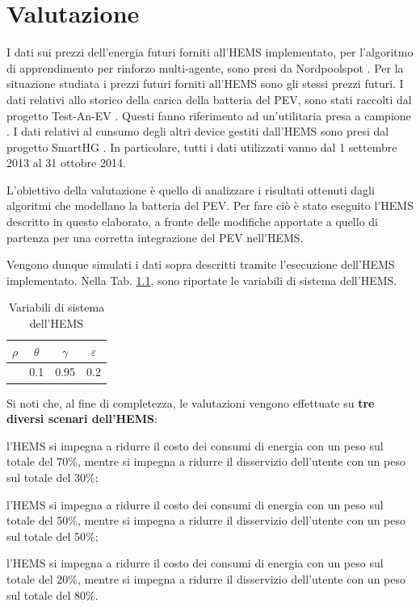 \documentclass[italian, Lau, oneside]{sapthesis}
\begin{document}
\chapter{Valutazione}
\label{cap:6}
I dati sui prezzi dell'energia futuri forniti all'HEMS implementato, per l'algoritmo di apprendimento per rinforzo multi-agente, sono presi da Nordpoolspot \cite{ref:nordpool}. Per la situazione studiata i prezzi futuri forniti all'HEMS sono gli stessi prezzi futuri. I dati relativi allo storico della carica della batteria del PEV, sono stati raccolti dal progetto Test-An-EV \cite{ref:PEVdata}. Questi fanno riferimento ad un'utilitaria presa a campione \cite{ref:pev}. I dati relativi al cunsumo degli altri device gestiti dall'HEMS sono presi dal progetto SmartHG \cite{ref:SmartHG}. In particolare, tutti i dati utilizzati vanno dal 1 settembre 2013 al 31 ottobre 2014.

L'obiettivo della valutazione è quello di analizzare i risultati ottenuti dagli algoritmi che modellano la batteria del PEV. Per fare ciò è stato eseguito l'HEMS descritto in questo elaborato, a fronte delle modifiche apportate a quello di partenza per una corretta integrazione del PEV nell'HEMS.

Vengono dunque simulati i dati sopra descritti tramite l'esecuzione dell'HEMS implementato. Nella Tab. \ref{tab:variabili}, sono riportate le variabili di sistema dell'HEMS.


\begin{table}[h]
    \center
    \caption{Variabili di sistema dell'HEMS}
    \label{tab:variabili}
    \begin{tabular}{c|c|c|c}
        \hline
        \hline
        $\rho$ & $\theta$ & $\gamma$ & $\varepsilon$ \\
        \hline
        [0.3, 0.5, 0.8] & 0.1 & 0.95 & 0.2 \\
        \hline
        \hline
    \end{tabular}
\end{table}

Si noti che, al fine di completezza, le valutazioni vengono effettuate su \textbf{tre diversi scenari dell'HEMS}:
\begin{description}
\addtolength{\itemindent}{0.5cm}
    \item [scenario con $\mathbf{\rho = 0.3}$] l'HEMS si impegna a ridurre il costo dei consumi di energia con un peso sul totale del 70\%, mentre si impegna a ridurre il disservizio dell'utente con un peso sul totale del 30\%;
    \item [scenario con $\mathbf{\rho = 0.5}$] l'HEMS si impegna a ridurre il costo dei consumi di energia con un peso sul totale del 50\%, mentre si impegna a ridurre il disservizio dell'utente con un peso sul totale del 50\%;
    \item [scenario con $\mathbf{\rho = 0.8}$] l'HEMS si impegna a ridurre il costo dei consumi di energia con un peso sul totale del 20\%, mentre si impegna a ridurre il disservizio dell'utente con un peso sul totale del 80\%.
\end{description}
\end{document}

